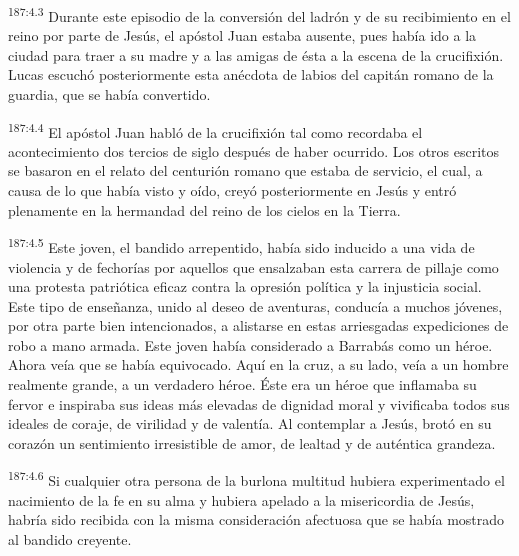 \par
\textsuperscript{187:4.3} Durante este episodio de la conversión del ladrón y de su recibimiento en el reino por parte de Jesús, el apóstol Juan estaba ausente, pues había ido a la ciudad para traer a su madre y a las amigas de ésta a la escena de la crucifixión. Lucas escuchó posteriormente esta anécdota de labios del capitán romano de la guardia, que se había convertido.

\par
\textsuperscript{187:4.4} El apóstol Juan habló de la crucifixión tal como recordaba el acontecimiento dos tercios de siglo después de haber ocurrido. Los otros escritos se basaron en el relato del centurión romano que estaba de servicio, el cual, a causa de lo que había visto y oído, creyó posteriormente en Jesús y entró plenamente en la hermandad del reino de los cielos en la Tierra.

\par
\textsuperscript{187:4.5} Este joven, el bandido arrepentido, había sido inducido a una vida de violencia y de fechorías por aquellos que ensalzaban esta carrera de pillaje como una protesta patriótica eficaz contra la opresión política y la injusticia social. Este tipo de enseñanza, unido al deseo de aventuras, conducía a muchos jóvenes, por otra parte bien intencionados, a alistarse en estas arriesgadas expediciones de robo a mano armada. Este joven había considerado a Barrabás como un héroe. Ahora veía que se había equivocado. Aquí en la cruz, a su lado, veía a un hombre realmente grande, a un verdadero héroe. Éste era un héroe que inflamaba su fervor e inspiraba sus ideas más elevadas de dignidad moral y vivificaba todos sus ideales de coraje, de virilidad y de valentía. Al contemplar a Jesús, brotó en su corazón un sentimiento irresistible de amor, de lealtad y de auténtica grandeza.

\par
\textsuperscript{187:4.6} Si cualquier otra persona de la burlona multitud hubiera experimentado el nacimiento de la fe en su alma y hubiera apelado a la misericordia de Jesús, habría sido recibida con la misma consideración afectuosa que se había mostrado al bandido creyente.

